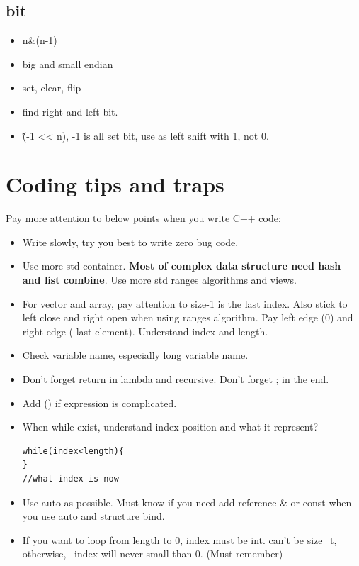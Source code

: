 \documentclass[a4paper,11pt,twoside]{book}
\begin{document}
\subsection{bit}
\begin{itemize}
	\item n\&(n-1)
	
	\item big and small endian
	
	\item set, clear, flip
	
	\item find right and left bit.
	
	\item \~(-1 << n), -1 is all set bit, use as left shift with 1, not 0. 
	
\end{itemize}



\section{Coding tips and traps}

Pay more attention to below points when you write C++ code:

\begin{itemize}
	\item Write slowly, try you best to write zero bug code. 
	
	\item Use more std container. \textbf{Most of complex data structure need hash and list combine}. Use more std ranges algorithms and views.
	
	\item For vector and array, pay attention to size-1 is the last index. Also stick to left close and right open when using ranges algorithm. Pay left edge (0) and right edge ( last element). Understand index and length. 
	
	\item Check variable name, especially long variable name. 
	
	\item Don't forget return in lambda and recursive. Don't forget ; in the end. 
	
	\item Add () if expression is complicated. 
	
	\item When while exist, understand index position and what it represent?
	
\begin{lstlisting}
while(index<length){
}
//what index is now	
\end{lstlisting}	

	\item Use auto as possible. Must know if you need add reference \& or const when you use auto and structure bind. 
	
	\item If you want to loop from length to 0, index must be int. can't be size\_t, otherwise, --index will never small than 0. (Must remember)
\end{itemize}
\end{document}
